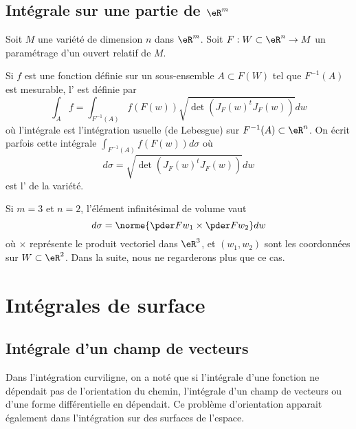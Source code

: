 \subsection{Intégrale sur une partie de \( \eR^m\)}

Soit \( M\) une variété de dimension \( n\) dans \( \eR^m\). Soit \( F : W \subset \eR^n \to M\) un paramétrage d'un ouvert relatif de \( M\).

Si \( f\) est une fonction définie sur un sous-ensemble \( A \subset F(W)\) tel que \( F^{-1}(A)\) est mesurable, l' est définie par
\begin{equation*}
	\int_A f = \int_{F^{-1}(A)} f(F(w)) \sqrt{\det(J_F(w)^t {J_F(w)})} dw
\end{equation*}
où l'intégrale est l'intégration usuelle (de Lebesgue) sur \( F^{-1}(A) \subset \eR^n\). On écrit parfois cette intégrale \( \int_{F^{-1}(A)} f(F(w)) d\sigma\) où
\begin{equation}        \label{EQooARMAooQPhQAL}
	d\sigma = \sqrt{\det(J_F(w)^t {J_F(w)})} dw
\end{equation}
est l' de la variété.

Si \( m = 3\) et \( n = 2\), l'élément infinitésimal de volume vaut
\begin{equation*}
	d \sigma = \norme{\pder F {w_1} \times \pder F {w_2}} dw
\end{equation*}
où \( \times\) représente le produit vectoriel dans \( \eR^3\), et \( (w_1,w_2)\) sont les coordonnées sur \( W \subset \eR^2\). Dans la suite, nous ne regarderons plus que ce cas.

\section{Intégrales de surface}
\label{secintsurfaciques}

\subsection{Intégrale d'un champ de vecteurs}
Dans l'intégration curviligne, on a noté que si l'intégrale d'une fonction ne dépendait pas de l'orientation du chemin, l'intégrale d'un champ de vecteurs ou d'une forme différentielle en dépendait. Ce problème d'orientation apparait également dans l'intégration sur des surfaces de l'espace.

